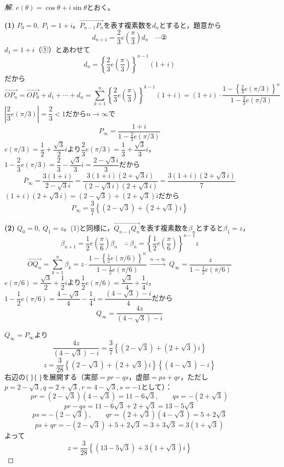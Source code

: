 \documentclass[../main.tex]{subfiles}
\begin{document}
\begin{proof}[解]
  $e(\theta)=\cos\theta+i\sin\theta$とおく。

  \textbf{(1)} $P_0=0,\ P_1=1+i$。$\overrightarrow{P_{n-1}P_n}$を表す複素数を$d_n$とすると，題意から
  \[
    d_{n+1}=\frac23e\left(\frac\pi3\right)d_n \quad\cdots\text{②}
  \]
  $d_1=1+i$（①）とあわせて
  \[
    d_n=\left\{\frac23e\left(\frac\pi3\right)\right\}^{n-1}(1+i)
  \]
  だから
  \[
    \overrightarrow{OP_n}=\overrightarrow{OP_0}+d_1+\cdots+d_n=\sum_{k=1}^n\left\{\frac23e\left(\frac\pi3\right)\right\}^{k-1}(1+i)=(1+i)\cdot\frac{1-\left\{\frac23e(\pi/3)\right\}^n}{1-\frac23e(\pi/3)}
  \]
  $\left|\dfrac23e(\pi/3)\right|=\dfrac23<1$だから$n\to\infty$で
  \[
    P_\infty=\frac{1+i}{1-\frac23e(\pi/3)}
  \]
  $e(\pi/3)=\dfrac12+\dfrac{\sqrt3}2i$より$\dfrac23e(\pi/3)=\dfrac13+\dfrac{\sqrt3}3i$，$1-\dfrac23e(\pi/3)=\dfrac23-\dfrac{\sqrt3}3i=\dfrac{2-\sqrt3i}3$だから
  \[
    P_\infty=\frac{3(1+i)}{2-\sqrt3i}=\frac{3(1+i)(2+\sqrt3i)}{(2-\sqrt3i)(2+\sqrt3i)}=\frac{3(1+i)(2+\sqrt3i)}7
  \]
  $(1+i)(2+\sqrt3i)=(2-\sqrt3)+(2+\sqrt3)i$だから
  \[
    P_\infty=\frac37\left\{(2-\sqrt3)+(2+\sqrt3)i\right\}
  \]

  \textbf{(2)} $Q_0=0,\ Q_1=z$。(1)と同様に，$\overrightarrow{Q_{n-1}Q_n}$を表す複素数を$\beta_n$とすると$\beta_1=z$，
  \[
    \beta_{n+1}=\frac12e\left(\frac\pi6\right)\beta_n \quad\therefore\ \beta_n=\left\{\frac12e\left(\frac\pi6\right)\right\}^{n-1}z
  \]
  \[
    \overrightarrow{OQ_n}=\sum_{k=1}^n\beta_k=z\cdot\frac{1-\left\{\frac12e(\pi/6)\right\}^n}{1-\frac12e(\pi/6)} \ \xrightarrow{n\to\infty}\ Q_\infty=\frac z{1-\frac12e(\pi/6)}
  \]
  $e(\pi/6)=\dfrac{\sqrt3}2+\dfrac12i$より$\dfrac12e(\pi/6)=\dfrac{\sqrt3}4+\dfrac14i$，$1-\dfrac12e(\pi/6)=\dfrac{4-\sqrt3}4-\dfrac14i=\dfrac{(4-\sqrt3)-i}4$だから
  \[
    Q_\infty=\frac{4z}{(4-\sqrt3)-i}
  \]

  $Q_\infty=P_\infty$より
  \[
    \frac{4z}{(4-\sqrt3)-i}=\frac37\left\{(2-\sqrt3)+(2+\sqrt3)i\right\}
  \]
  \[
    z=\frac3{28}\left\{(2-\sqrt3)+(2+\sqrt3)i\right\}\left\{(4-\sqrt3)-i\right\}
  \]
  右辺の$\{\ \}\{\ \}$を展開する（実部$=pr-qs$，虚部$=ps+qr$，ただし$p=2-\sqrt3,q=2+\sqrt3,r=4-\sqrt3,s=-1$として）：
  \[
    pr=(2-\sqrt3)(4-\sqrt3)=11-6\sqrt3,\qquad qs=-(2+\sqrt3)
  \]
  \[
    pr-qs=11-6\sqrt3+2+\sqrt3=13-5\sqrt3
  \]
  \[
    ps=-(2-\sqrt3),\qquad qr=(2+\sqrt3)(4-\sqrt3)=5+2\sqrt3
  \]
  \[
    ps+qr=-(2-\sqrt3)+5+2\sqrt3=3+3\sqrt3=3(1+\sqrt3)
  \]
  よって
  \[
    z=\frac3{28}\left\{(13-5\sqrt3)+3(1+\sqrt3)i\right\}
  \]
\end{proof}
\end{document}
